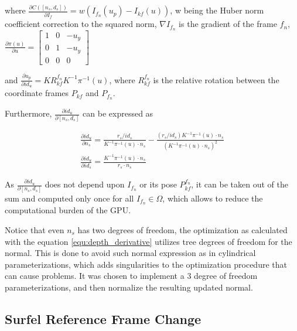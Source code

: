 \documentclass[1p]{elsarticle}
\begin{document}
where $\frac{\partial C([n_{s}, d_{s}])}{\partial I_{f}} = w (I_{f_{n}}(u_{p}) -I_{kf}(u))$, w being the Huber norm coefficient correction to the squared norm,  $\nabla I_{f_{n}}$ is the gradient of the frame $f_{n}$, $\frac{\partial \pi(u)}{\partial u} = \begin{bmatrix}
1 & 0 & -u_{y} \\
0 & 1 & -u_{y}\\ 
0 & 0 & 0
\end{bmatrix}$ 

and $\frac{\partial u_{p}}{\partial id_{u}}= KR_{kf}^{f_{n}}K^{-1}\pi^{-1}(u)$, where $R_{kf}^{f_{n}}$ is the relative rotation between the coordinate frames $P_{kf}$ and $P_{f_{n}}$.

Furthermore, $\frac{\partial id_{u}}{\partial [n_{s}, d_{s}]}$ can be expressed as

\begin{equation}
\begin{gathered}
	\frac{\partial id_{u}}{\partial n_{s}} = \frac{r_{s}/id_{s}}{K^{-1}\pi^{-1}(u)\cdot n_{s}} - \frac{(r_{s}/id_{s})K^{-1}\pi^{-1}(u)\cdot n_{s}}{(K^{-1}\pi^{-1}(u)\cdot n_{s})^{2}} \\
	\frac{\partial id_{u}}{\partial id_{s}} = \frac{K^{-1}\pi^{-1}(u) \cdot n_{s}}{r_{s} \cdot n_{s}} 
\end{gathered}
	\label{equ:depth_derivative}
\end{equation}

As $\frac{\partial id_{u}}{\partial [n_{s}, d_{s}]}$ does not depend upon $I_{f_{n}}$ or its pose $P_{kf}^{f_{n}}$, it can be taken out of the sum and computed only once for all $I_{f_{n}} \in \Omega$, which allows to reduce the computational burden of the GPU.

Notice that even $n_{s}$ has two degrees of freedom, the optimization as calculated with the equation \ref{equ:depth_derivative} utilizes tree degrees of freedom for the normal. This is done to avoid such normal expression as in cylindrical parameterizations, which adds singularities to the optimization procedure that can cause problems. It was chosen to implement a 3 degree of freedom parameterizations, and then normalize the resulting updated normal.

\subsection{Surfel Reference Frame Change}
\label{sec:surfel_reference_frame_change}
\end{document}
